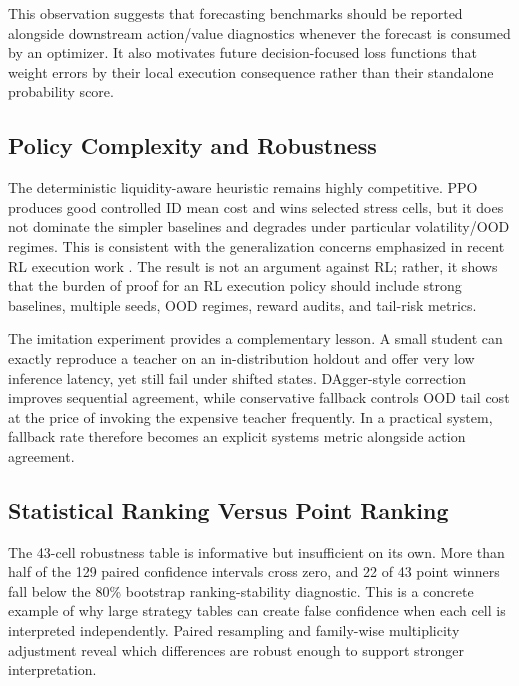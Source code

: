 \documentclass[journal,10pt]{IEEEtran}
\newcommand{\1}{\mathbf{1}}
\begin{document}
This observation suggests that forecasting benchmarks should be reported alongside downstream action/value diagnostics whenever the forecast is consumed by an optimizer. It also motivates future decision-focused loss functions that weight errors by their local execution consequence rather than their standalone probability score.

\subsection{Policy Complexity and Robustness}
The deterministic liquidity-aware heuristic remains highly competitive. PPO produces good controlled ID mean cost and wins selected stress cells, but it does not dominate the simpler baselines and degrades under particular volatility/OOD regimes. This is consistent with the generalization concerns emphasized in recent RL execution work \cite{ZhangDuanChen2023}. The result is not an argument against RL; rather, it shows that the burden of proof for an RL execution policy should include strong baselines, multiple seeds, OOD regimes, reward audits, and tail-risk metrics.

The imitation experiment provides a complementary lesson. A small student can exactly reproduce a teacher on an in-distribution holdout and offer very low inference latency, yet still fail under shifted states. DAgger-style correction improves sequential agreement, while conservative fallback controls OOD tail cost at the price of invoking the expensive teacher frequently. In a practical system, fallback rate therefore becomes an explicit systems metric alongside action agreement.

\subsection{Statistical Ranking Versus Point Ranking}
The 43-cell robustness table is informative but insufficient on its own. More than half of the 129 paired confidence intervals cross zero, and 22 of 43 point winners fall below the 80\% bootstrap ranking-stability diagnostic. This is a concrete example of why large strategy tables can create false confidence when each cell is interpreted independently. Paired resampling and family-wise multiplicity adjustment reveal which differences are robust enough to support stronger interpretation.
\end{document}

